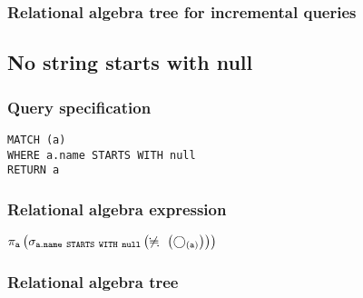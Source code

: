\subsubsection*{Relational algebra tree for incremental queries}


\subsection{No string starts with null}

\subsubsection*{Query specification}

\begin{lstlisting}
MATCH (a)
WHERE a.name STARTS WITH null
RETURN a
\end{lstlisting}

\subsubsection*{Relational algebra expression}

$\projection{\var{a}} \left(\selection{\mathtt{a.name~STARTS~WITH~null}} \left(\alldifferent{} \left(\getvertices{a}{}\right)\right)\right)$

\subsubsection*{Relational algebra tree}


